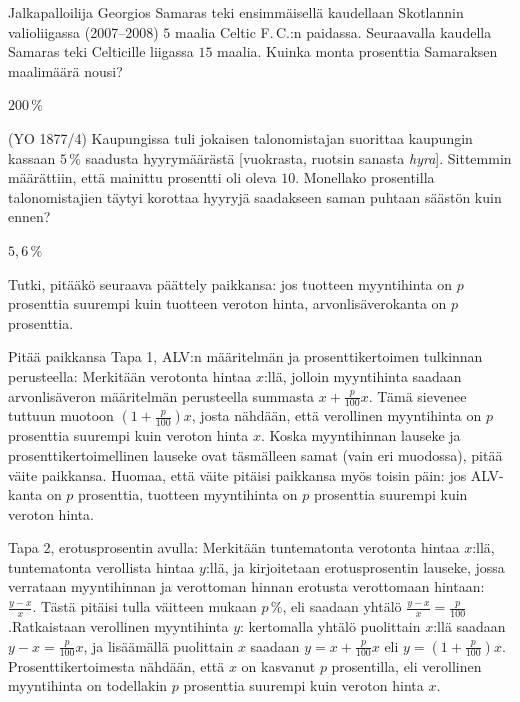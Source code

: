 \begin{tehtavasivu}

\begin{tehtava}
    Jalkapalloilija Georgios Samaras teki ensimmäisellä kaudellaan Skotlannin valioliigassa (2007--2008) $5$ maalia Celtic F.\,C.:n paidassa. Seuraavalla kaudella Samaras teki Celticille liigassa $15$ maalia. Kuinka monta prosenttia Samaraksen maalimäärä nousi?
    \begin{vastaus}
        $200\,\%$
    \end{vastaus}
\end{tehtava}

\begin{tehtava}
    (YO 1877/4) Kaupungissa tuli jokaisen talonomistajan suorittaa kaupungin kassaan $5\,\%$ saadusta hyyrymäärästä [vuokrasta, ruotsin sanasta \textit{hyra}]. Sittemmin määrättiin, että mainittu prosentti oli oleva $10$. Monellako prosentilla talonomistajien täytyi korottaa hyyryjä saadakseen saman puhtaan säästön kuin ennen?
    \begin{vastaus}
        $5,6\,\%$
    \end{vastaus}
\end{tehtava}

\begin{tehtava}
Tutki, pitääkö seuraava päättely paikkansa: jos tuotteen myyntihinta on $p$ prosenttia suurempi kuin tuotteen veroton hinta, arvonlisäverokanta on $p$ prosenttia.
	\begin{vastaus}
	Pitää paikkansa
	 Tapa 1, ALV:n määritelmän ja prosenttikertoimen tulkinnan perusteella: Merkitään verotonta hintaa $x$:llä, jolloin myyntihinta saadaan arvonlisäveron määritelmän perusteella summasta $x+\frac{p}{100}x$. Tämä sievenee tuttuun muotoon $(1+\frac{p}{100})x$, josta nähdään, että verollinen myyntihinta on $p$ prosenttia suurempi kuin veroton hinta $x$. Koska myyntihinnan lauseke ja prosenttikertoimellinen lauseke ovat täsmälleen samat (vain eri muodossa), pitää väite paikkansa. Huomaa, että väite pitäisi paikkansa myös toisin päin: jos ALV-kanta on $p$ prosenttia, tuotteen myyntihinta on $p$ prosenttia suurempi kuin veroton hinta.
	
	Tapa 2, erotusprosentin avulla: Merkitään tuntematonta verotonta hintaa $x$:llä, tuntematonta verollista hintaa $y$:llä, ja kirjoitetaan erotusprosentin lauseke, jossa verrataan myyntihinnan ja verottoman hinnan erotusta verottomaan hintaan: $\frac{y-x}{x}$. Tästä pitäisi tulla väitteen mukaan $p$\,\%, eli saadaan yhtälö $\frac{y-x}{x}=\frac{p}{100}$.Ratkaistaan verollinen myyntihinta $y$: kertomalla yhtälö puolittain $x$:llä saadaan $y-x=\frac{p}{100}x$, ja lisäämällä puolittain $x$ saadaan $y=x+\frac{p}{100}x$ eli $y=(1+\frac{p}{100})x$. Prosenttikertoimesta nähdään, että $x$ on kasvanut $p$ prosentilla, eli verollinen myyntihinta on todellakin $p$ prosenttia suurempi kuin veroton hinta $x$.
	\end{vastaus}
\end{tehtava}


\end{tehtavasivu}
